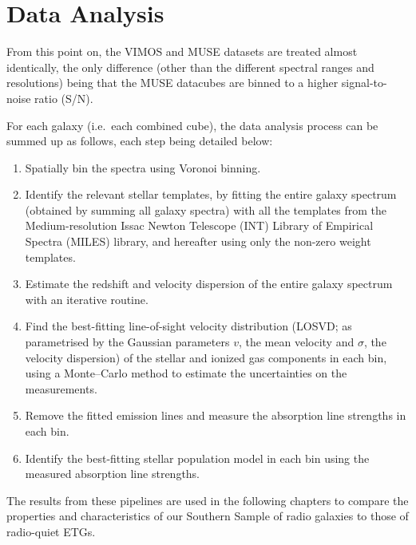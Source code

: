 \section{Data Analysis}
	\label{sec:analysis}
	From this point on, the VIMOS and MUSE datasets are treated almost identically, the only difference (other than the different spectral ranges and resolutions) being that the MUSE datacubes are binned to a higher signal-to-noise ratio (S/N).

	For each galaxy (i.e.\ each combined cube), the data analysis process can be summed up as follows, each step being detailed below:
	\begin{enumerate}
		\item Spatially bin the spectra using Voronoi binning.
		\item Identify the relevant stellar templates, by fitting the entire galaxy spectrum (obtained by summing all galaxy spectra) with all the templates from the Medium-resolution Issac Newton Telescope (INT) Library of Empirical Spectra (MILES) library, and hereafter using only the non-zero weight templates.
		\item Estimate the redshift and velocity dispersion of the entire galaxy spectrum with an iterative routine. %
		\item Find the best-fitting line-of-sight velocity distribution (LOSVD; as parametrised by the Gaussian parameters $v$, the mean velocity and $\sigma$, the velocity dispersion) of the stellar and ionized gas components in each bin, using a Monte--Carlo method to estimate the uncertainties on the measurements. 
		\item Remove the fitted emission lines and measure the absorption line strengths in each bin. 
		\item Identify the best-fitting stellar population model in each bin using the measured absorption line strengths.
	\end{enumerate}

	The results from these pipelines are used in the following chapters to compare the properties and characteristics of our Southern Sample of radio galaxies to those of radio-quiet ETGs. 
	
